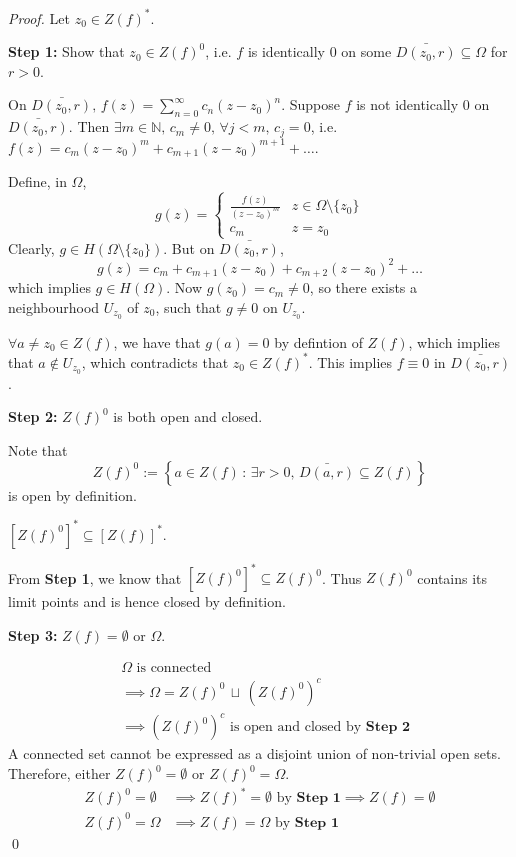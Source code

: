 \documentclass[11pt, oneside]{book}
\begin{document}
\begin{proof}
	Let $z_0 \in Z(f)^*$.

	\textbf{Step 1:} Show that $z_0 \in Z(f)^0$, i.e. $f$ is identically $0$ on some $\bar{D(z_0, r)} \subseteq \Omega$ for $r > 0$. 

	On $\bar{D(z_0, r)}, \, f(z) = \sum_{n=0}^{\infty} c_n (z - z_0)^n$. Suppose $f$ is not identically $0$ on $\bar{D(z_0, r)}$. Then $\exists m \in \mathbb{N}, \, c_m \neq 0, \, \forall j < m , \, c_j = 0$, i.e. $f(z) = c_m(z - z_0)^m + c_{m + 1}(z - z_0)^{m + 1} + \hdots$.

	Define, in $\Omega$,
	\begin{equation*}
		g(z) = \begin{cases}
			\frac{f(z)}{(z - z_0)^m} 	& z \in \Omega \setminus \{z_0\} \\
			c_m 						& z = z_0
		\end{cases}
	\end{equation*}
	Clearly, $g \in H(\Omega \setminus \{z_0\})$. But on $\bar{D(z_0, r)}$,
	\begin{equation*}
		g(z) = c_m + c_{m + 1}(z - z_0) + c_{m + 2}(z - z_0)^2 + \hdots
	\end{equation*}
	which implies $g \in H(\Omega)$. Now $g(z_0) = c_m \neq 0$, so there exists a neighbourhood $U_{z_0}$ of $z_0$, such that $g \neq 0$ on $U_{z_0}$.

	$\forall a \neq z_0 \in Z(f)$, we have that $g(a) = 0$ by defintion of $Z(f)$, which implies that $a \notin U_{z_0}$, which contradicts that $z_0 \in Z(f)^*$. This implies $f \equiv 0$ in $\bar{D(z_0, r)}$.

	\textbf{Step 2:} $Z(f)^0$ is both open and closed.

	Note that
	\begin{equation*}
		Z(f)^0 := \left\{a \in Z(f) \, : \, \exists r > 0, \, \bar{D(a, r)} \subseteq Z(f) \right\}
	\end{equation*}
	is open by definition.

	 $[Z(f)^0]^* \subseteq [Z(f)]^*$.

	From \textbf{Step 1}, we know that $[Z(f)^0]^* \subseteq Z(f)^0$. Thus $Z(f)^0$ contains its limit points and is hence closed by definition.

	\textbf{Step 3: } $Z(f) = \emptyset$ or $\Omega$.

	\begin{align*}
		& \Omega \text{ is connected} \\
		&\implies \Omega = Z(f)^0 \, \sqcup \, \left( Z(f)^0 \right)^c \\
		&\implies \left( Z(f)^0 \right)^c \text{ is open and closed by } \textbf{Step 2} 
	\end{align*}
	A connected set cannot be expressed as a disjoint union of non-trivial open sets. Therefore, either $Z(f)^0 = \emptyset$ or $Z(f)^0 = \Omega$.
	\begin{align*}
		Z(f)^0 = \emptyset &\implies Z(f)^* = \emptyset \text{ by } \textbf{Step 1} \implies Z(f) = \emptyset \\
		Z(f)^0 = \Omega &\implies Z(f) = \Omega \text{ by } \textbf{Step 1}  
	\end{align*} \qed
\end{proof}
\end{document}
